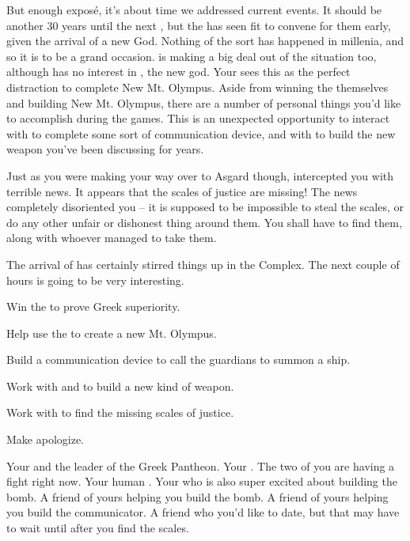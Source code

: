 \documentclass[char]{guardians}
\begin{document}
But enough expos\'{e}, it's about time we addressed current events. It should be another 30 years until the next \pGames{}, but the \cCaretaker{} has seen fit to convene for them early, given the arrival of a new God. Nothing of the sort has happened in millenia, and so it is to be a grand occasion. \cZeus{} is making a big deal out of the situation too, although \cZeus{\they} has no interest in \cUnity{}, the new god. Your \cZeus{\parent} sees this as the perfect distraction to complete New Mt. Olympus. Aside from winning the \pGames{} themselves and building New Mt. Olympus, there are a number of personal things you'd like to accomplish during the games. This is an unexpected opportunity to interact with \cFenrir{} to complete some sort of communication device, and with \cVal{} to build the new weapon you've been discussing for years.

Just as you were making your way over to Asgard though, \cAnubis{} intercepted you with terrible news. It appears that the scales of justice are missing! The news completely disoriented you -- it is supposed to be impossible to steal the scales, or do any other unfair or dishonest thing around them. You shall have to find them, along with whoever managed to take them.

The arrival of \cUnity{} has certainly stirred things up in the Complex. The next couple of hours is going to be very interesting.

\begin{itemz}[Goals]
  \item Win the \pGames{} to prove Greek superiority.
  \item Help \cZeus{} use the \stone{} to create a new Mt. Olympus.
  \item Build a communication device to call the guardians to summon a ship.
  \item Work with \cHephaestus{} and \cVal{} to build a new kind of weapon.
  \item Work with \cAnubis{} to find the missing scales of justice.
  \item Make \cHera{} apologize.
\end{itemz}


\begin{contacts}
  \contact{\cZeus{}} Your \cZeus{\parent} and the leader of the Greek Pantheon.
  \contact{\cHera{}} Your \cHera{\parent}. The two of you are having a fight right now.
  \contact{\cPandora{}} Your human \cPandora{\sibling}.
  \contact{\cHephaestus{}} Your \cHephaestus{\sibling} who is also super excited about building the bomb.
  \contact{\cVal{}} A friend of yours helping you build the bomb.
  \contact{\cFenrir{}} A friend of yours helping you build the communicator.
  \contact{\cAnubis{}} A friend who you'd like to date, but that may have to wait until after you find the scales.
\end{contacts}
\end{document}
